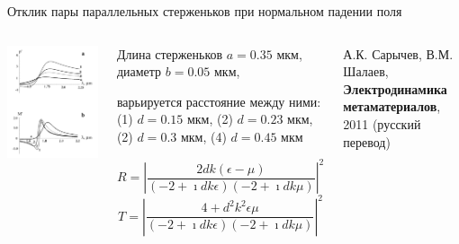 \documentclass[9pt, compress, xcolor=table]{beamer}
\begin{document}
\begin{frame}{Отклик пары параллельных стерженьков при нормальном падении поля}

\begin{columns}[c]
\column{7cm}
\begin{center}
\includegraphics[width=\textwidth]{neg_ref0}
\end{center}
\column{5.5cm}
\begin{center}
Длина стерженьков $a=0.35$ мкм, диаметр $b=0.05$ мкм, 

варьируется расстояние между ними: (1) $d=0.15$ мкм, (2) $d=0.23$ мкм, (2) $d=0.3$ мкм, (4) $d=0.45$ мкм

\begin{equation*}
R=\left|\frac{2 d k (\epsilon-\mu)}{(-2+\imath d k \epsilon)(-2+\imath d k \mu)}\right|^2
\end{equation*}
\begin{equation*}
T=\left|\frac{4+ d^2 k^2 \epsilon\mu}{(-2+\imath d k \epsilon)(-2+\imath d k \mu)}\right|^2
\end{equation*}
\end{center}

А.К. Сарычев, В.М. Шалаев, \textbf{Электродинамика метаматериалов}, 2011 (русский перевод)

\end{columns}
\end{frame}
\end{document}
